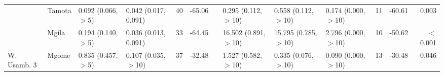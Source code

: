 \begin{tabular}{llllccclllccr}
            & Tamota         & 0.092 (0.066, $>$5)   & 0.042 (0.017, 0.091)   & 40  & -65.06  & & 0.295  (0.112, $>$10)   & 0.558  (0.112, $>$10)   & 0.174  (0.000, $>$10)   & 11  & -60.61   & 0.003\\
            & Mgila          & 0.194 (0.140, $>$5)   & 0.036 (0.013, 0.091)   & 33  & -64.45  & & 16.502 (0.891, $>$10)   & 15.795 (0.785, $>$10)   & 2.796  (0.000, $>$10)   & 10  & -50.62   & $<$0.001\\
\cmidrule{2-13}
W. Usamb. 3 & Mgome          & 0.835 (0.457, $>$5)   & 0.107 (0.035, $>$10)   & 37  & -32.48  & & 1.527  (0.582, $>$10)   & 0.335  (0.076, $>$10)   & 0.090  (0.000, $>$10)   & 13  & -30.48   & 0.046\\
\bottomrule
\end{tabular}